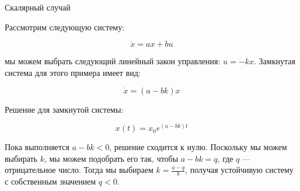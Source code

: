 \documentclass{beamer}
\begin{document}
\begin{frame}{Скалярный случай}
	\begin{flushleft}
		
		Рассмотрим следующую систему:
		
		\begin{equation}
			\dot x = a x + b u
		\end{equation}
		
		мы можем выбрать следующий линейный закон управления: $u = - k x$. Замкнутая система для этого примера имеет вид:
		
		\begin{equation}
			\dot x = (a- bk) x
		\end{equation}		
		
		Решение для замкнутой системы:
		
		\begin{equation}
			x(t) =  x_0 e^{(a- bk)t}
		\end{equation}		
		
		Пока выполняется $a- bk < 0$, решение сходится к нулю. Поскольку мы можем выбирать $k$, мы можем подобрать его так, чтобы $a- bk = q$, где $q$ — отрицательное число. Тогда мы выбираем $k = \frac{a-q}{b}$, получая устойчивую систему с собственным значением $q < 0$.
		
		\end{flushleft}
	\end{frame}
\end{document}
